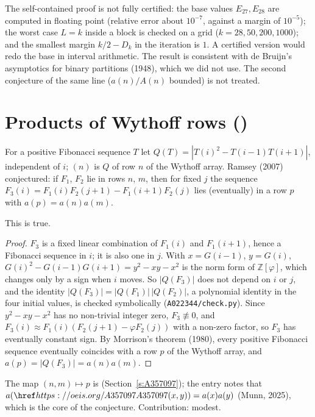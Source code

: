 \begin{remark} The self-contained proof is not fully certified: the base values $E_{27},E_{28}$ are computed in floating point
(relative error about $10^{-7}$, against a margin of $10^{-5}$); the worst case $L=k$ inside a block is checked on a
grid ($k=28,50,200,1000$); and the smallest margin $k/2-D_k$ in the iteration is $1$. A certified version would
redo the base in interval arithmetic. The result is consistent with de Bruijn's asymptotics for binary partitions
(1948), which we did not use. The second conjecture of the same line ($a(n)/A(n)$ bounded) is not treated.
\end{remark}

\section{Products of Wythoff rows ()}\label{s:A022344}
For a positive Fibonacci sequence $T$ let $Q(T)=|T(i)^2-T(i-1)T(i+1)|$, independent of $i$; $(n)$ is
$Q$ of row $n$ of the Wythoff array. Ramsey (2007) conjectured: if $F_1$, $F_2$ lie in rows $n$, $m$, then for fixed
$j$ the sequence $F_3(i)=F_1(i)F_2(j+1)-F_1(i+1)F_2(j)$ lies (eventually) in a row $p$ with $a(p)=a(n)a(m)$.
\begin{proposition} This is true.\end{proposition}
\begin{proof} $F_3$ is a fixed linear combination of $F_1(i)$ and $F_1(i+1)$, hence a Fibonacci sequence in $i$; it
is also one in $j$. With $x=G(i-1)$, $y=G(i)$, $G(i)^2-G(i-1)G(i+1)=y^2-xy-x^2$ is the norm form of
$\mathbb{Z}[\varphi]$, which changes only by a sign when $i$ moves. So $|Q(F_3)|$ does not depend on $i$ or $j$, and
the identity $|Q(F_3)|=|Q(F_1)|\,|Q(F_2)|$, a polynomial identity in the four initial values, is checked
symbolically (\texttt{A022344/check.py}). Since $y^2-xy-x^2$ has no non-trivial integer zero, $F_3\not\equiv0$, and
$F_3(i)\approx F_1(i)(F_2(j+1)-\varphi F_2(j))$ with a non-zero factor, so $F_3$ has eventually constant sign. By
Morrison's theorem (1980), every positive Fibonacci sequence eventually coincides with a row $p$ of the Wythoff
array, and $a(p)=|Q(F_3)|=a(n)a(m)$. \end{proof}
The map $(n,m)\mapsto p$ is  (Section~\ref{s:A357097}); the entry notes that
$a(\oeis{A357097}(x,y))=a(x)a(y)$ (Munn, 2025), which is the core of the conjecture. Contribution: modest.
